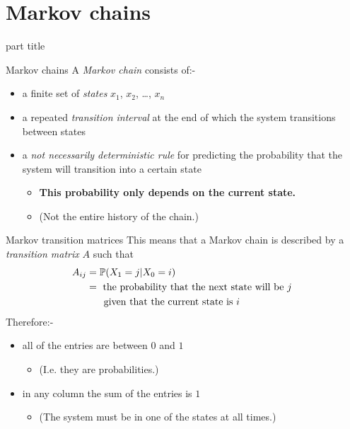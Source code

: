 \documentclass{beamer}
\begin{document}
\section{Markov chains}

\begin{frame}
\begin{beamercolorbox}[sep=12pt,center]{part title}
\insertsection\par
\end{beamercolorbox}
\end{frame}

\begin{frame}{Markov chains}
A \emph{Markov chain} consists of:-\vfill
\begin{itemize}
	\item a finite set of \emph{states} $x_1$, $x_2$, \dots, $x_n$\vfill
	\item a repeated \emph{transition interval} at the end of which the system transitions between states\vfill
	\item a \emph{not necessarily deterministic rule} for predicting the probability that the system will transition into a certain state
	\begin{itemize}
		\item {\bf This probability only depends on the current state.}
		\item (Not the entire history of the chain.)
	\end{itemize}
\end{itemize}
\end{frame}

\begin{frame}{Markov transition matrices}
This means that a Markov chain is described by a \emph{transition matrix} $A$ such that
\begin{align*}
A_{ij} &= \mathbb{P}(X_1 = j | X_0 = i)\\
&= \text{ the probability that the next state will be $j$ }\\
&\hspace{0.5cm} \text{ given that the current state is $i$}
\end{align*}
Therefore:-
\begin{itemize}
	\item all of the entries are between $0$ and $1$
	\begin{itemize}
		\item (I.e. they are probabilities.)
	\end{itemize}
	\item in any column the sum of the entries is $1$
	\begin{itemize}
		\item (The system must be in one of the states at all times.)
	\end{itemize}
\end{itemize}
\end{frame}
\end{document}
